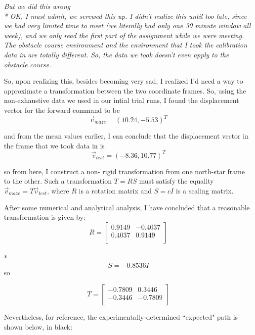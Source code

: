 \documentclass{article}
\begin{document}
\vspace{8mm}
\em But we did this wrong \rm 
\vspace{8mm}
\\*
OK, I must admit, we screwed this up. I didn't realize this until too late, since we had very limited time to meet (we literally had only one 30 minute window all week), and we only read the first part of the assignment while we were meeting. The obstacle course environment and the environment that I took the calibration data in are totally different. So, the data we took doesn't even apply to the obstacle course.

So, upon realizing this, besides becoming very sad, I realized I'd need a way to approximate a transformation between the two coordinate frames. So, using the non-exhaustive data we used in our intial trial runs, I found the displacement vector for the forward command to be 
$$
\vec{v}_{maze} = (10.24, -5.53)^T 
$$

and from the mean values earlier, I can conclude that the displacement vector in the frame that we took data in is
$$
\vec{v}_{test} = (-8.36, 10.77 )^T
$$

so from here, I construct a non- rigid transformation from one north-star frame to the other. Such a transformation $T= RS$ must satisfy the equality $\vec{v}_{maze} = T\vec{v}_{test}$, where $R$ is a rotation matrix and $S = cI$ is a scaling matrix.

After some numerical and analytical analysis, I have concluded that a reasonable transformation is given by:
$$
R = \left[\begin{array}{cc}
0.9149 & -0.4037 \\
0.4037 & 0.9149 \\
\end{array}\right]$$ \\*
$$
S = -0.8536I
$$
so

$$
T = \left[\begin{array}{cc}
-0.7809 & 0.3446 \\
-0.3446 & -0.7809 \\
\end{array}\right]
$$

Nevertheless, for reference, the experimentally-determined ``expected" path is shown below, in black:
\end{document}
